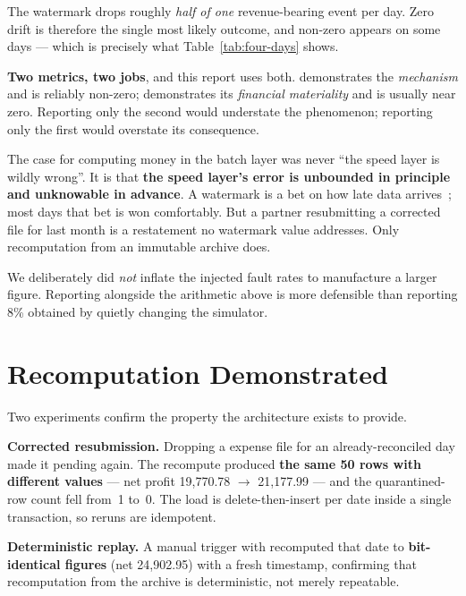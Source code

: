 The watermark drops roughly \emph{half of one} revenue-bearing event per
day. Zero drift is therefore the single most likely outcome, and non-zero
appears on some days --- which is precisely what
Table~\ref{tab:four-days} shows.

\textbf{Two metrics, two jobs}, and this report uses both.
 demonstrates the
\emph{mechanism} and is reliably non-zero;
 demonstrates its \emph{financial
materiality} and is usually near zero. Reporting only the second would
understate the phenomenon; reporting only the first would overstate its
consequence.

The case for computing money in the batch layer was never ``the speed
layer is wildly wrong''. It is that \textbf{the speed layer's error is
unbounded in principle and unknowable in advance}. A watermark is a bet
on how late data arrives~\cite{akidau2015dataflow}; most days that bet is
won comfortably. But a partner resubmitting a corrected file for last
month is a restatement no watermark value addresses. Only recomputation
from an immutable archive does.

We deliberately did \emph{not} inflate the injected fault rates to
manufacture a larger figure. Reporting  alongside the
arithmetic above is more defensible than reporting 8\% obtained by
quietly changing the simulator.

\section{Recomputation Demonstrated}
\label{sec:recompute}

Two experiments confirm the property the architecture exists to provide.

\textbf{Corrected resubmission.} Dropping a  expense file for an
already-reconciled day made it pending again. The recompute produced
\textbf{the same 50 rows with different values} --- net profit
19,770.78 $\rightarrow$ 21,177.99 --- and the quarantined-row count fell
from~1 to~0. The load is delete-then-insert per date inside a single
transaction, so reruns are idempotent.

\textbf{Deterministic replay.} A manual trigger with
 recomputed that date
to \textbf{bit-identical figures} (net 24,902.95) with a fresh
 timestamp, confirming that recomputation from the
archive is deterministic, not merely repeatable.

